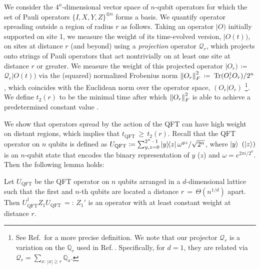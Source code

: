 We consider the $4^n$-dimensional vector space of $n$-qubit operators for which the set of Pauli operators $\{I,X,Y,Z\}^{\otimes n}$ forms a basis.
We quantify operator spreading outside a region of radius $r$ as follows.
Taking an operator $|O)$ initially supported on site 1, we measure the weight of its time-evolved version, $|O(t))$, on sites at distance $r$ (and beyond) using a \emph{projection} operator $\mathcal{Q}_{r}$, which projects onto strings of Pauli operators that act nontrivially on at least one site at distance $r$ or greater.
We measure the weight of this projected operator $|O_r)$\,$\coloneqq$\,$\mathcal{Q}_{r}|O(t))$ via the (squared) normalized Frobenius norm $\left\|O_r\right\|_F^2$\,$\coloneqq$\,$\mathrm{Tr}(O_r^\dag O_r)/2^n$, which coincides with the Euclidean norm over the operator space, $(O_r|O_r)$ \footnote{See Ref.\,\cite{Tran2020hierarchylinearlightcones} for a more precise definition.
    We note that our projector $\mathcal{Q}_r$ is a variation on the $\mathbb{Q}_r$ used in {Ref.\,\cite{Tran2020hierarchylinearlightcones}}.
    Specifically, for $d=1$, they are related via $\mathcal{Q}_r = \sum_{x:\,|x|\ge r} \mathbb{Q}_x$.}.
We define $t_2(r)$ to be the minimal time after which $\left\|O_r\right\|_F^2$ is able to achieve a predetermined constant value \cite{Tran2020hierarchylinearlightcones}.

We show that operators spread by the action of the QFT can have high weight on distant regions,
which implies that $t_\mathrm{QFT}$\,$\geq$\,$t_2(r)$.
Recall that the QFT operator on $n$ qubits is defined as $U_\mathrm{QFT} \coloneqq \sum_{y,z=0}^{2^n-1} \ketbra{y}{z} {\omega^{yz}}/{\sqrt{2^n}}$, where $\left | y \right\rangle$ $(\left | z \right\rangle)$ is an $n$-qubit state that encodes the binary representation of $y$ ($z$) and $\omega = e^{2\pi i/2^n}$.
Then the following lemma holds:
\begin{lemma*} \label{lem_qft_weight}
Let $U_\mathrm{QFT}$ be the QFT operator on $n$ qubits arranged in a $d$-dimensional lattice such that the first and $n$-th qubits are located a distance $r$\,$=$\,$\Theta(n^{1/d})$ apart.
Then $U_\mathrm{QFT}^\dag Z_1 U_\mathrm{QFT}$\,$=:$\,$Z_1' $ is an operator with at least constant weight at distance $r$.
\end{lemma*}

